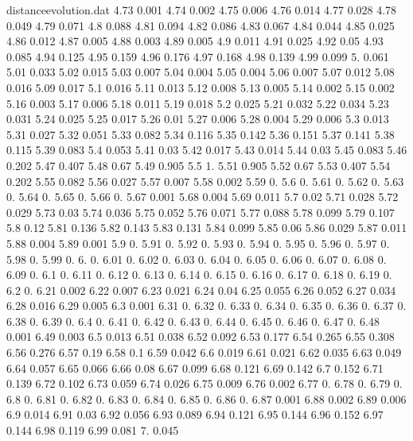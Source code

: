 \documentclass[a4paper,12pt,listof=totoc,index=totoc,bibliography=totoc,headsepline=false,headings=normal,BCOR16.153846mm,DIV12,headinclude,twoside,cleardoublepage=empty,numbers=noenddot,final]{scrreprt}
\theoremstyle{mystyle}
\numberwithin{equation}{section}
\numberwithin{figure}{section}
\numberwithin{lemma}{section}
\numberwithin{theorem}{section}
\numberwithin{corollary}{section}
\numberwithin{definition}{section}
\numberwithin{conjecture}{section}
\numberwithin{observation}{section}
\newcommand{\+}{\mkern2mu}
\DeclareMathOperator{\1}{\mathds{1}}
\begin{document}
\begin{filecontents}{distanceevolution.dat}
4.73	0.001
4.74	0.002
4.75	0.006
4.76	0.014
4.77	0.028
4.78	0.049
4.79	0.071
4.8	0.088
4.81	0.094
4.82	0.086
4.83	0.067
4.84	0.044
4.85	0.025
4.86	0.012
4.87	0.005
4.88	0.003
4.89	0.005
4.9	0.011
4.91	0.025
4.92	0.05
4.93	0.085
4.94	0.125
4.95	0.159
4.96	0.176
4.97	0.168
4.98	0.139
4.99	0.099
5.	0.061
5.01	0.033
5.02	0.015
5.03	0.007
5.04	0.004
5.05	0.004
5.06	0.007
5.07	0.012
5.08	0.016
5.09	0.017
5.1	0.016
5.11	0.013
5.12	0.008
5.13	0.005
5.14	0.002
5.15	0.002
5.16	0.003
5.17	0.006
5.18	0.011
5.19	0.018
5.2	0.025
5.21	0.032
5.22	0.034
5.23	0.031
5.24	0.025
5.25	0.017
5.26	0.01
5.27	0.006
5.28	0.004
5.29	0.006
5.3	0.013
5.31	0.027
5.32	0.051
5.33	0.082
5.34	0.116
5.35	0.142
5.36	0.151
5.37	0.141
5.38	0.115
5.39	0.083
5.4	0.053
5.41	0.03
5.42	0.017
5.43	0.014
5.44	0.03
5.45	0.083
5.46	0.202
5.47	0.407
5.48	0.67
5.49	0.905
5.5	1.
5.51	0.905
5.52	0.67
5.53	0.407
5.54	0.202
5.55	0.082
5.56	0.027
5.57	0.007
5.58	0.002
5.59	0.
5.6	0.
5.61	0.
5.62	0.
5.63	0.
5.64	0.
5.65	0.
5.66	0.
5.67	0.001
5.68	0.004
5.69	0.011
5.7	0.02
5.71	0.028
5.72	0.029
5.73	0.03
5.74	0.036
5.75	0.052
5.76	0.071
5.77	0.088
5.78	0.099
5.79	0.107
5.8	0.12
5.81	0.136
5.82	0.143
5.83	0.131
5.84	0.099
5.85	0.06
5.86	0.029
5.87	0.011
5.88	0.004
5.89	0.001
5.9	0.
5.91	0.
5.92	0.
5.93	0.
5.94	0.
5.95	0.
5.96	0.
5.97	0.
5.98	0.
5.99	0.
6.	0.
6.01	0.
6.02	0.
6.03	0.
6.04	0.
6.05	0.
6.06	0.
6.07	0.
6.08	0.
6.09	0.
6.1	0.
6.11	0.
6.12	0.
6.13	0.
6.14	0.
6.15	0.
6.16	0.
6.17	0.
6.18	0.
6.19	0.
6.2	0.
6.21	0.002
6.22	0.007
6.23	0.021
6.24	0.04
6.25	0.055
6.26	0.052
6.27	0.034
6.28	0.016
6.29	0.005
6.3	0.001
6.31	0.
6.32	0.
6.33	0.
6.34	0.
6.35	0.
6.36	0.
6.37	0.
6.38	0.
6.39	0.
6.4	0.
6.41	0.
6.42	0.
6.43	0.
6.44	0.
6.45	0.
6.46	0.
6.47	0.
6.48	0.001
6.49	0.003
6.5	0.013
6.51	0.038
6.52	0.092
6.53	0.177
6.54	0.265
6.55	0.308
6.56	0.276
6.57	0.19
6.58	0.1
6.59	0.042
6.6	0.019
6.61	0.021
6.62	0.035
6.63	0.049
6.64	0.057
6.65	0.066
6.66	0.08
6.67	0.099
6.68	0.121
6.69	0.142
6.7	0.152
6.71	0.139
6.72	0.102
6.73	0.059
6.74	0.026
6.75	0.009
6.76	0.002
6.77	0.
6.78	0.
6.79	0.
6.8	0.
6.81	0.
6.82	0.
6.83	0.
6.84	0.
6.85	0.
6.86	0.
6.87	0.001
6.88	0.002
6.89	0.006
6.9	0.014
6.91	0.03
6.92	0.056
6.93	0.089
6.94	0.121
6.95	0.144
6.96	0.152
6.97	0.144
6.98	0.119
6.99	0.081
7.	0.045
\end{filecontents}
\end{document}
